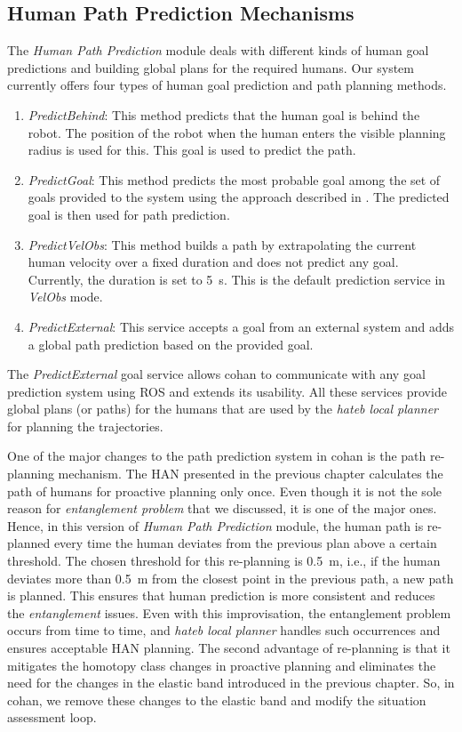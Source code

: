 \subsection{Human Path Prediction Mechanisms}\label{human_path_predict_cohan}
The \textit{Human Path Prediction} module deals with different kinds of human goal predictions and building global plans for the required humans. Our system currently offers four types of human goal prediction and path planning methods.
\begin{enumerate}
    \item \textit{PredictBehind}: This method predicts that the human goal is behind the robot. The position of the robot when the human enters the visible planning radius is used for this. This goal is used to predict the path.
    \item \textit{PredictGoal}: This method predicts the most probable goal among the set of goals provided to the system using the approach described in \cite{ferrer2014bayesian}. The predicted goal is then used for path prediction.
    \item \textit{PredictVelObs}: This method builds a path by extrapolating the current human velocity over a fixed duration and does not predict any goal. Currently, the duration is set to \SI{5}{\second}. This is the default prediction service in \textit{VelObs} mode.
    \item \textit{PredictExternal}: This service accepts a goal from an external system and adds a global path prediction based on the provided goal.
\end{enumerate}
The \textit{PredictExternal} goal service allows \acrshort{cohan} to communicate with any goal prediction system using ROS and extends its usability. All these services provide global plans (or paths) for the humans that are used by the \textit{\acrshort{hateb} local planner} for planning the trajectories. 

One of the major changes to the path prediction system in \acrshort{cohan} is the path re-planning mechanism. The HAN presented in the previous chapter calculates the path of humans for proactive planning only once. Even though it is not the sole reason for \textit{entanglement problem} that we discussed, it is one of the major ones. Hence, in this version of \textit{Human Path Prediction} module, the human path is re-planned every time the human deviates from the previous plan above a certain threshold. The chosen threshold for this re-planning is \SI{0.5}{\metre}, i.e., if the human deviates more than \SI{0.5}{\metre} from the closest point in the previous path, a new path is planned. This ensures that human prediction is more consistent and reduces the \textit{entanglement} issues. Even with this improvisation, the entanglement problem occurs from time to time, and \textit{\acrshort{hateb} local planner} handles such occurrences and ensures acceptable HAN planning. The second advantage of re-planning is that it mitigates the homotopy class changes in proactive planning and eliminates the need for the changes in the elastic band introduced in the previous chapter. So, in \acrshort{cohan}, we remove these changes to the elastic band and modify the situation assessment loop.  

